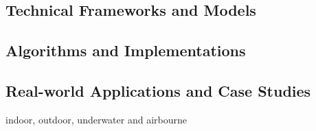 \documentclass[12pt]{article}
\begin{document}
\subsection{Technical Frameworks and Models} %
\subsection{Algorithms and Implementations} %
\subsection{Real-world Applications and Case Studies} %
indoor, outdoor, underwater and airbourne

%
\end{document}
